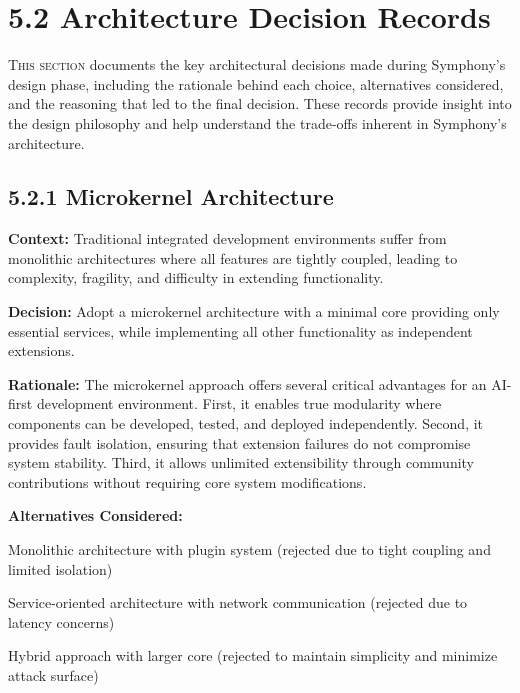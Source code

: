 
\section{5.2 Architecture Decision Records}
\label{sec:architecture-decisions}
\setcounter{subsection}{0}

\lettrine{T}{his section} documents the key architectural decisions made during Symphony's design phase, including the rationale behind each choice, alternatives considered, and the reasoning that led to the final decision. These records provide insight into the design philosophy and help understand the trade-offs inherent in Symphony's architecture.

\subsection*{5.2.1 Microkernel Architecture}

\textbf{Context:} Traditional integrated development environments suffer from monolithic architectures where all features are tightly coupled, leading to complexity, fragility, and difficulty in extending functionality.

\textbf{Decision:} Adopt a microkernel architecture with a minimal core providing only essential services, while implementing all other functionality as independent extensions.

\textbf{Rationale:} The microkernel approach offers several critical advantages for an AI-first development environment. First, it enables true modularity where components can be developed, tested, and deployed independently. Second, it provides fault isolation, ensuring that extension failures do not compromise system stability. Third, it allows unlimited extensibility through community contributions without requiring core system modifications.

\textbf{Alternatives Considered:}
\begin{compactlist}
    \item Monolithic architecture with plugin system (rejected due to tight coupling and limited isolation)
    \item Service-oriented architecture with network communication (rejected due to latency concerns)
    \item Hybrid approach with larger core (rejected to maintain simplicity and minimize attack surface)
\end{compactlist}

